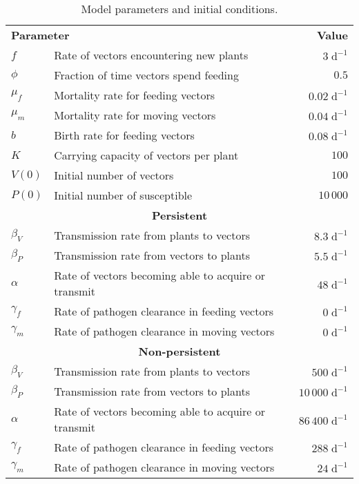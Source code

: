 \documentclass{article}
\begin{document}
\begin{table}
  \centering
  \begin{tabular}{llr}
    \multicolumn{2}{l}{\textbf{Parameter}}
    & \multicolumn{1}{r}{\textbf{Value}}
    \\
    $f$ & Rate of vectors encountering new plants & $3\;\text{d}^{-1}$
    \\
    $\phi$ & Fraction of time vectors spend feeding & $0.5$
    \\
    $\mu_f$ & Mortality rate for feeding vectors & $0.02\;\text{d}^{-1}$
    \\
    $\mu_m$ & Mortality rate for moving vectors & $0.04\;\text{d}^{-1}$
    \\
    $b$ & Birth rate for feeding vectors & $0.08\;\text{d}^{-1}$
    \\
    $K$ & Carrying capacity of vectors per plant & $100$
    \\
    $V(0)$ & Initial number of vectors & $100$
    \\
    $P(0)$ & Initial number of susceptible & $10\,000$
    \\
    \multicolumn{3}{c}{\textbf{Persistent}}
    \\
    $\beta_V$ & Transmission rate from plants to vectors & $8.3\;\text{d}^{-1}$
    \\
    $\beta_P$ & Transmission rate from vectors to plants & $5.5\;\text{d}^{-1}$
    \\
    $\alpha$ & Rate of vectors becoming able to acquire or transmit & $48\;\text{d}^{-1}$
    \\
    $\gamma_f$ & Rate of pathogen clearance in feeding vectors & $0\;\text{d}^{-1}$
    \\
    $\gamma_m$ & Rate of pathogen clearance in moving vectors & $0\;\text{d}^{-1}$
    \\
    \multicolumn{3}{c}{\textbf{Non-persistent}}
    \\
    $\beta_V$ & Transmission rate from plants to vectors & $500\;\text{d}^{-1}$
    \\
    $\beta_P$ & Transmission rate from vectors to plants & $10\,000\;\text{d}^{-1}$
    \\
    $\alpha$ & Rate of vectors becoming able to acquire or transmit & $86\,400\;\text{d}^{-1}$
    \\
    $\gamma_f$ & Rate of pathogen clearance in feeding vectors & $288\;\text{d}^{-1}$ \\
    $\gamma_m$ & Rate of pathogen clearance in moving vectors & $24\;\text{d}^{-1}$
  \end{tabular}
  \caption{Model parameters and initial conditions.}
  \label{params}
\end{table}
\end{document}
